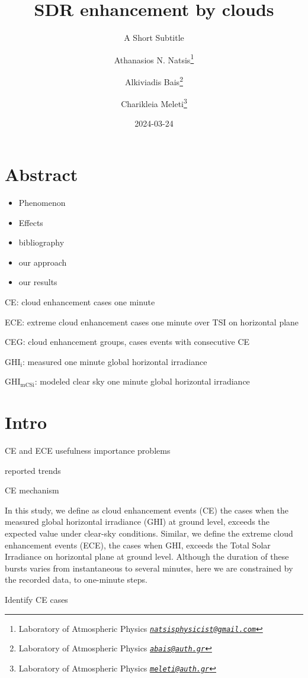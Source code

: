 \documentclass[
]{article}
\title{SDR enhancement by clouds}
\subtitle{A Short Subtitle}
\author{Athanasios N. Natsis\footnote{Laboratory of Atmospheric Physics \emph{\href{mailto:natsisphysicist@gmail.com}{\nolinkurl{natsisphysicist@gmail.com}}}} \and Alkiviadis Bais\footnote{Laboratory of Atmospheric Physics \emph{\href{mailto:abais@auth.gr}{\nolinkurl{abais@auth.gr}}}} \and Charikleia Meleti\footnote{Laboratory of Atmospheric Physics \emph{\href{mailto:meleti@auth.gr}{\nolinkurl{meleti@auth.gr}}}}}
\date{2024-03-24}
\providecommand{\tightlist}{%
  \setlength{\itemsep}{0pt}\setlength{\parskip}{0pt}}
\begin{document}
\maketitle

{
\setcounter{tocdepth}{4}
\tableofcontents
}
\hypertarget{abstract}{%
\section*{Abstract}\label{abstract}}

\begin{itemize}
\tightlist
\item
  Phenomenon
\item
  Effects
\item
  bibliography
\item
  our approach
\item
  our results
\end{itemize}

CE: cloud enhancement cases one minute

ECE: extreme cloud enhancement cases one minute over TSI on horizontal plane

CEG: cloud enhancement groups, cases events with consecutive CE

\(\text{GHI}_\text{i}\): measured one minute global horizontal irradiance

\(\text{GHI}_\text{mCSi}\): modeled clear sky one minute global horizontal irradiance

\hypertarget{intro}{%
\section{Intro}\label{intro}}

CE and ECE usefulness
importance
problems

reported trends

CE mechanism

In this study, we define as cloud enhancement events (CE) the cases when the measured
global horizontal irradiance (GHI) at ground level, exceeds the expected value under
clear-sky conditions.
Similar, we define the extreme cloud enhancement events (ECE), the cases when GHI,
exceeds the Total Solar Irradiance on horizontal plane at ground level.
Although the duration of these bursts varies from instantaneous to several minutes,
here we are constrained by the recorded data, to one-minute steps.

Identify CE cases
\end{document}
